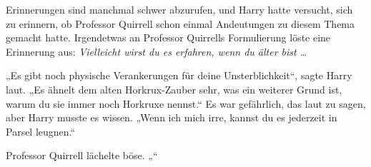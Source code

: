 Erinnerungen sind manchmal schwer abzurufen, und Harry hatte versucht, sich zu erinnern, ob Professor Quirrell schon einmal Andeutungen zu diesem Thema gemacht hatte. Irgendetwas an Professor Quirrells Formulierung löste eine Erinnerung aus:
\emph{Vielleicht wirst du es erfahren, wenn du älter bist …}

„Es gibt noch physische Verankerungen für deine Unsterblichkeit“, sagte Harry laut.
„Es ähnelt dem alten Horkrux-Zauber sehr, was ein weiterer Grund ist, warum du sie immer noch Horkruxe nennst.“
Es war gefährlich, das laut zu sagen, aber Harry musste es wissen.
„Wenn ich mich irre, kannst du es jederzeit in Parsel leugnen.“

Professor Quirrell lächelte böse.
„“

